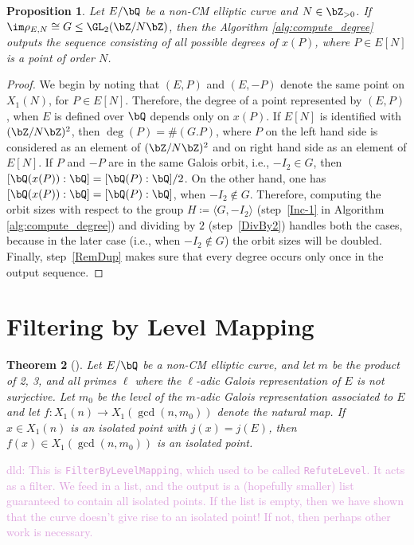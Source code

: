 \documentclass[11pt,reqno]{amsart}
\theoremstyle{plain}
\newtheorem{theorem}{Theorem}%
\newtheorem{proposition}[theorem]{Proposition}
\theoremstyle{definition}
\newcommand{\Q}{\bQ}
\newcommand{\Z}{\bZ}
\newcommand{\dld}[1]{\textcolor{Plum}{dld: #1}}
\begin{document}
\begin{proposition}
Let $E/\Q$ be a non-CM elliptic curve and $N \in \Z_{>0}$. If $\im \rho_{E,N} \cong G \leq \GL_2(\Z/N\Z)$, then the Algorithm \ref{alg:compute_degree} outputs the sequence consisting of all possible degrees of $x(P)$, where $P\in E[N]$ is a point of order $N$.
\end{proposition}
\begin{proof}
    We begin by noting that $(E, P)$ and $(E, -P)$ denote the same point on $X_1(N)$, for $P \in E[N]$. Therefore, the degree of
    a point represented by $(E, P)$, when
    $E$ is defined over $\Q$ depends only on $x(P)$.
    If $E[N]$ is identified with $(\Z/N\Z)^2$, then $\deg(P)=\# (G. P)$, where $P$ on the left hand side is considered as an element of $(\Z/N\Z)^2$
    and on right hand side as an element of $E[N]$.
    If $P$ and $-P$ are in the same Galois orbit, i.e., $-I_2\in G$, then $[\Q(x(P)):\Q]=[\Q(P):\Q]/2$. On the other hand, one has $[\Q(x(P)):\Q]=[\Q(P):\Q]$, when
    $-I_2\notin G$.
    Therefore, computing the orbit sizes with respect to the
    group $H\coloneqq \langle G, -I_2 \rangle$ (step~\ref{Inc-1} in Algorithm \ref{alg:compute_degree}) and dividing
    by $2$ (step~\ref{DivBy2}) handles both the cases, because in the later case (i.e., when $-I_2\notin G$) the orbit sizes will be doubled.
    Finally, step~\ref{RemDup} makes sure that every degree occurs only once in the output sequence.
\end{proof}


\section{Filtering by Level Mapping}

\begin{theorem}[\cite{BELOV}]\label{BELOVthm}
Let $E/\Q$ be a non-CM elliptic curve, and let $m$ be the product of 2, 3, and all primes $\ell$ where the $\ell$-adic Galois representation of $E$ is not surjective. Let $m_0$ be the level of the $m$-adic Galois representation associated to $E$ and let $f: X_1(n) \rightarrow X_1(\gcd(n,m_0))$ denote the natural map. If $x\in X_1(n)$ is an isolated point with $j(x)=j(E)$, then $f(x)\in X_1(\gcd(n,m_0))$ is an isolated point.
\end{theorem}

\dld{This is \texttt{FilterByLevelMapping}, which used to be called
\texttt{RefuteLevel}. It acts as a filter. We feed in a list, and the output is
a (hopefully smaller) list guaranteed to contain all isolated points. If the
list is empty, then we have shown that the curve doesn't give rise to an
isolated point! If not, then perhaps other work is necessary.}
\end{document}
